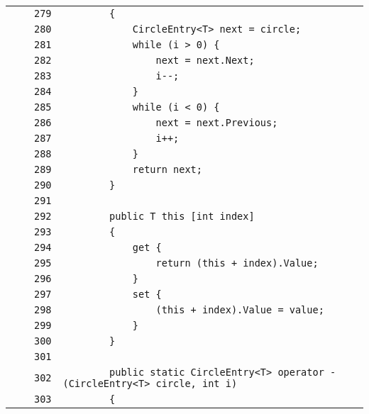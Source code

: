 \documentclass[a4paper,10pt]{article}
\begin{document}
\begin{longtable}[l]{lrrl}
\cellcolor{gray} &  & \verb~279~ & \verb~        {~\\
\cellcolor{gray} &  & \verb~280~ & \verb~            CircleEntry<T> next = circle;~\\
\cellcolor{gray} &  & \verb~281~ & \verb~            while (i > 0) {~\\
\cellcolor{gray} &  & \verb~282~ & \verb~                next = next.Next;~\\
\cellcolor{gray} &  & \verb~283~ & \verb~                i--;~\\
\cellcolor{gray} &  & \verb~284~ & \verb~            }~\\
\cellcolor{gray} &  & \verb~285~ & \verb~            while (i < 0) {~\\
\cellcolor{gray} &  & \verb~286~ & \verb~                next = next.Previous;~\\
\cellcolor{gray} &  & \verb~287~ & \verb~                i++;~\\
\cellcolor{gray} &  & \verb~288~ & \verb~            }~\\
\cellcolor{gray} &  & \verb~289~ & \verb~            return next;~\\
\cellcolor{gray} &  & \verb~290~ & \verb~        }~\\
\cellcolor{gray} &  & \verb~291~ & \verb~~\\
\cellcolor{gray} &  & \verb~292~ & \verb~        public T this [int index]~\\
\cellcolor{gray} &  & \verb~293~ & \verb~        {~\\
\cellcolor{gray} &  & \verb~294~ & \verb~            get {~\\
\cellcolor{gray} &  & \verb~295~ & \verb~                return (this + index).Value;~\\
\cellcolor{gray} &  & \verb~296~ & \verb~            }~\\
\cellcolor{gray} &  & \verb~297~ & \verb~            set {~\\
\cellcolor{gray} &  & \verb~298~ & \verb~                (this + index).Value = value;~\\
\cellcolor{gray} &  & \verb~299~ & \verb~            }~\\
\cellcolor{gray} &  & \verb~300~ & \verb~        }~\\
\cellcolor{gray} &  & \verb~301~ & \verb~~\\
\cellcolor{gray} &  & \verb~302~ & \verb~        public static CircleEntry<T> operator - (CircleEntry<T> circle, int i)~\\
\cellcolor{gray} &  & \verb~303~ & \verb~        {~\\

\end{longtable}
\end{document}

